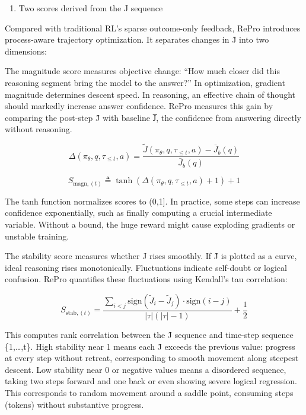 \begin{enumerate}
\def\labelenumi{(\arabic{enumi})}
\setcounter{enumi}{2}
\tightlist
\item
  Two scores derived from the J sequence
\end{enumerate}

Compared with traditional RL's sparse outcome-only feedback, RePro introduces process-aware trajectory optimization. It separates changes in J̃ into two dimensions:

The magnitude score measures objective change: ``How much closer did this reasoning segment bring the model to the answer?'' In optimization, gradient magnitude determines descent speed. In reasoning, an effective chain of thought should markedly increase answer confidence. RePro measures this gain by comparing the post-step J̃ with baseline J̅, the confidence from answering directly without reasoning.

\[
\Delta(\pi_\theta, q, \tau_{\le t}, a)
=
\frac{
\tilde{J}(\pi_\theta, q, \tau_{\le t}, a) - \bar{J}_b(q)
}{
\bar{J}_b(q)
}
\]

\[
S_{\mathrm{magn},(t)}
\triangleq
\tanh\left(\Delta(\pi_\theta, q, \tau_{\le t}, a) + 1\right) + 1
\]

The tanh function normalizes scores to (0,1{]}. In practice, some steps can increase confidence exponentially, such as finally computing a crucial intermediate variable. Without a bound, the huge reward might cause exploding gradients or unstable training.

The stability score measures whether J rises smoothly. If J̃ is plotted as a curve, ideal reasoning rises monotonically. Fluctuations indicate self-doubt or logical confusion. RePro quantifies these fluctuations using Kendall's tau correlation:

\[
S_{\mathrm{stab},(t)}
=
\frac{
\sum_{i < j}
\mathrm{sign}(\tilde{J}_i - \tilde{J}_j)\cdot \mathrm{sign}(i - j)
}{
|\tau|(|\tau| - 1)
}
+
\frac{1}{2}
\]

This computes rank correlation between the J̃ sequence and time-step sequence \{1,\ldots,t\}. High stability near 1 means each J̃ exceeds the previous value: progress at every step without retreat, corresponding to smooth movement along steepest descent. Low stability near 0 or negative values means a disordered sequence, taking two steps forward and one back or even showing severe logical regression. This corresponds to random movement around a saddle point, consuming steps (tokens) without substantive progress.

